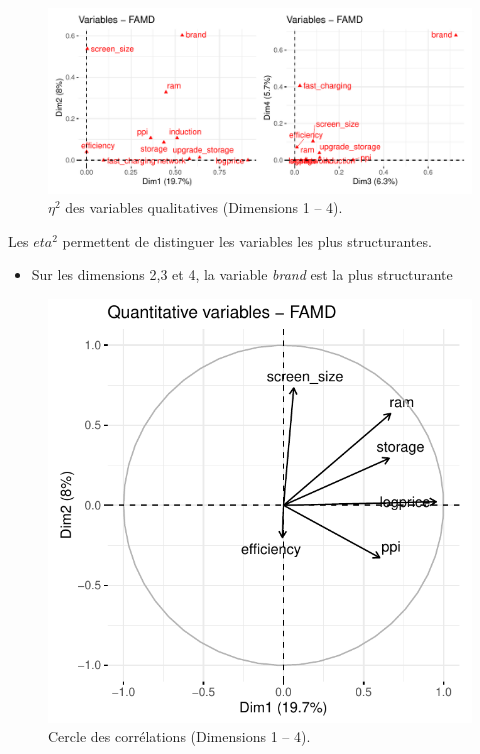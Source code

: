 \documentclass[
  12pt,
]{report}
\providecommand{\tightlist}{%
  \setlength{\itemsep}{0pt}\setlength{\parskip}{0pt}}\usepackage{longtable,booktabs,array}
\begin{document}
\begin{figure}[H]

{\centering \includegraphics{report_files/figure-pdf/unnamed-chunk-12-1.pdf}

}

\caption{\(\eta^2\) des variables qualitatives (Dimensions 1 -- 4).}

\end{figure}%

Les \(eta^2\) permettent de distinguer les variables les plus
structurantes.

\begin{itemize}
\tightlist
\item
  Sur les dimensions 2,3 et 4, la variable \emph{brand} est la plus
  structurante
\end{itemize}

\begin{figure}[H]

{\centering \includegraphics{report_files/figure-pdf/unnamed-chunk-13-1.pdf}

}

\caption{Cercle des corrélations (Dimensions 1 -- 4).}

\end{figure}%
\end{document}
